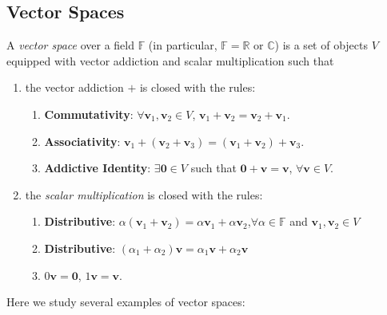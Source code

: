 \subsection{Vector Spaces}
\begin{definition}
A \emph{vector space} over a field $\mathbb{F}$ (in particular, $\mathbb{F}=\mathbb{R}$ or $\mathbb{C}$) is a set of objects $V$ equipped with vector addiction and scalar multiplication such that 
\begin{enumerate}
\item
the vector addiction $+$ is closed with the rules:
\begin{enumerate}
\item
\textbf{Commutativity}: $\forall\bm v_1,\bm v_2\in V$, $\bm v_1+\bm v_2=\bm v_2+\bm v_1$.
\item
\textbf{Associativity}: 
$\bm v_1+(\bm v_2+\bm v_3)=(\bm v_1+\bm v_2)+\bm v_3$.
\item
\textbf{Addictive Identity}: $\exists\bm0\in V$ such that $\bm0+\bm v=\bm v$, $\forall\bm v\in V$.
\end{enumerate}
\item
the \emph{scalar multiplication} is closed with the rules:
\begin{enumerate}
\item
\textbf{Distributive}:
$\alpha(\bm v_1+\bm v_2) = \alpha\bm v_1+\alpha\bm v_2$,$\forall\alpha\in\mathbb{F}$ and $\bm v_1,\bm v_2\in V$
\item
\textbf{Distributive}:
$(\alpha_1+\alpha_2)\bm v=\alpha_1\bm v+\alpha_2\bm v$
\item
$0\bm v=\bm0$, $1\bm v=\bm v$.
\end{enumerate}
\end{enumerate}
\end{definition}
Here we study several examples of vector spaces:
